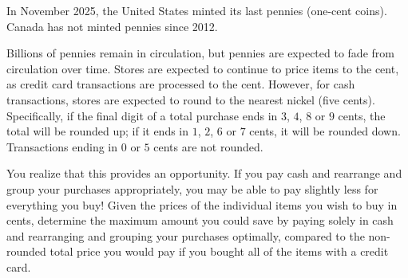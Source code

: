 




In November 2025, the United States minted its last pennies (one-cent
coins).  Canada has not minted pennies since 2012.

Billions of pennies remain in circulation, but pennies are
expected to fade from circulation over time.  Stores are expected to
continue to price items to the cent, as credit card transactions are
processed to the cent.  However, for cash transactions, stores are
expected to round to the nearest nickel (five cents).  Specifically, if
the final digit of a total purchase ends in $3$, $4$, $8$ or $9$ cents, the
total will be rounded up; if it ends in $1$, $2$, $6$ or $7$ cents, it will be
rounded down. Transactions ending in $0$ or $5$ cents are not rounded.

You realize that this provides an opportunity.  If you pay cash and
rearrange and group your purchases appropriately, you may be able to pay slightly
less for everything you buy!  Given the prices of the individual
items you wish to buy in cents, determine the maximum amount you could save by paying
solely in cash and rearranging and grouping your purchases optimally, compared to the
non-rounded total price you would pay if you bought all of the items 
with a credit card.

